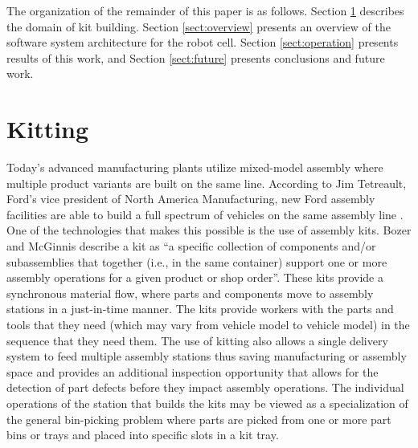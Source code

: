 \documentclass{llncs}
\begin{document}
The organization of the remainder of this paper is as follows. Section \ref{sect:kitting} describes the domain of kit building. Section \ref{sect:overview} presents
an overview of the software system architecture for the robot cell. Section \ref{sect:operation} presents results of this work, and Section \ref{sect:future} presents
conclusions and future work.
%
%
\section{Kitting}
\label{sect:kitting}
Today's advanced manufacturing plants utilize mixed-model assembly where multiple product variants are built on the same line.  
According to Jim Tetreault, Ford’s vice president of North America Manufacturing, 
new Ford assembly facilities are able to build a full spectrum of vehicles on the same assembly line \cite{James2011}. One of the technologies that makes this possible
is the use of assembly kits.  Bozer and McGinnis \cite{Bozer1992} describe a kit as ``a specific
collection of components and/or subassemblies that together (i.e., in the same container) support one or more assembly
operations for a given product or shop order''. These  kits provide a synchronous material flow, where parts and components move to 
assembly stations in a just-in-time manner. The kits provide workers with the parts and tools that they need (which may vary from 
vehicle model to vehicle model) in the sequence that they need them. The use of kitting also allows a single delivery system to feed
multiple assembly stations thus saving manufacturing or assembly space \cite{Medbo2003} and provides an additional inspection opportunity 
that allows for the detection of part defects before they impact assembly operations. The individual operations of the station 
that builds the kits may be viewed as a specialization of the general
bin-picking problem \cite{Schyja2012} where parts are picked from one or more part bins or trays and placed into specific slots in a kit tray.
\end{document}
